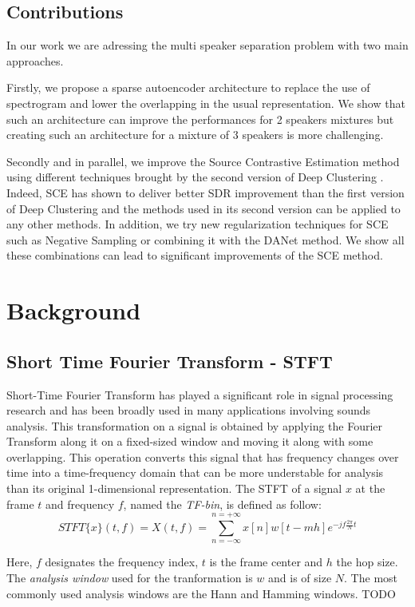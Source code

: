 \documentclass[master,final,11pt]{iscs-thesis}
\begin{document}
\section{Contributions}
\label{contrib}

In our work we are adressing the multi speaker separation problem with two main approaches. 

Firstly, we propose a sparse autoencoder architecture to replace the use of spectrogram and lower the overlapping in the usual representation. We show that such an architecture can improve the performances for 2 speakers mixtures but creating such an architecture for a mixture of 3 speakers is more challenging.

Secondly and in parallel, we improve the Source Contrastive Estimation method using different techniques brought by the second version of Deep Clustering \cite{DPCLV2}. Indeed, SCE has shown to deliver better SDR improvement than the first version of Deep Clustering \cite{DPCLV1} and the methods used in its second version can be applied to any other methods. In addition, we try new regularization techniques for SCE such as Negative Sampling or combining it with the DANet method. We show all these combinations can lead to significant improvements of the SCE method.

\chapter{Background}
\section{Short Time Fourier Transform - STFT}

Short-Time Fourier Transform has played a significant role in signal processing research and has been broadly used in many applications involving sounds analysis.
This transformation on a signal is obtained by applying the Fourier Transform along it on a fixed-sized window and moving it along with some overlapping. This operation converts this signal that has frequency changes over time into a time-frequency domain that can be more understable for analysis than its original 1-dimensional representation.
The STFT of a signal $x$ at the frame $t$ and frequency $f$, named the \textit{TF-bin}, is defined as follow:
\[
	STFT\{x\}(t,f) = X(t,f) = \sum_{n=-\infty}^{n=+\infty}x[n]w[t-mh]e^{-jf\frac{2\pi}{N}t }
\]

Here, $f$ designates the frequency index, $t$ is the frame center and $h$ the hop size. The \textit{analysis window} used for the tranformation is $w$ and is of size $N$. The most commonly used analysis windows are the Hann and Hamming windows. TODO
\end{document}

